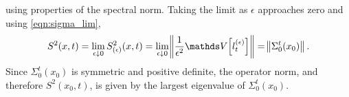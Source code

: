 using properties of the spectral norm.
Taking the limit as \(\epsilon\) approaches zero and using \eqref{eqn:sigma_lim},
\[
	S^2(x,t) = \lim_{\epsilon\downarrow 0} S^2_{(\epsilon)}(x,t) = \lim_{\epsilon\downarrow 0}\norm{\frac{1}{\epsilon^2}\var{l_t^{(\epsilon)}}} = \norm{\Sigma_0^t\!\left(x_0\right)}.
\]
Since \(\Sigma_0^t\!\left(x_0\right)\) is symmetric and positive definite, the operator norm, and therefore \(S^2\!\left(x_0,t\right)\), is given by the largest eigenvalue of \(\Sigma_0^t\!\left(x_0\right)\).
